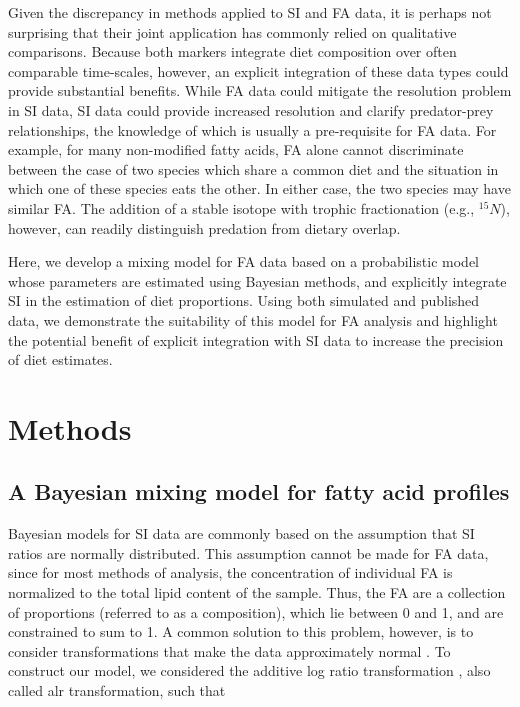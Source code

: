 \documentclass{article}%
\begin{document}
\begin{spacing}{1.9}
\begin{flushleft}
Given the discrepancy in methods applied to SI and FA data, it is
perhaps not surprising that their joint application has commonly
relied on qualitative comparisons. Because both markers integrate diet
composition over often comparable time-scales, however, an explicit
integration of these data types could provide substantial
benefits. While FA data could mitigate the resolution problem in SI
data, SI data could provide increased resolution and clarify
predator-prey relationships, the knowledge of which is usually a
pre-requisite for FA data. For example, for many non-modified fatty
acids, FA alone cannot discriminate between the case of two species
which share a common diet and the situation in which one of these
species eats the other.  In either case, the two species may have
similar FA. The addition of a stable isotope with trophic
fractionation (e.g., $^{15}N$), however, can readily distinguish predation
from dietary overlap.

Here, we develop a mixing model for FA data based on a probabilistic
model whose parameters are estimated using Bayesian methods, and
explicitly integrate SI in the estimation of diet proportions. Using both simulated and
published data, we demonstrate the suitability of this model for FA analysis and
highlight the potential benefit of explicit integration with SI data
to increase the precision of diet estimates.
 
\section{Methods}
\subsection{A Bayesian mixing model for fatty acid profiles}

Bayesian models for SI data are commonly based on the assumption that
SI ratios are normally distributed. This assumption cannot be made for
FA data, since for most methods of analysis, the concentration of
individual FA is normalized to the total lipid content of the
sample. Thus, the FA are a collection of proportions (referred to as
a composition), which lie between 0 and 1, and are constrained to sum
to 1. A common solution to this problem, however, is to consider
transformations that make the data approximately normal
\citep{budge_studying_2006}. To construct our model, we considered the
additive log ratio transformation \citep{aitchison_convex_1999},
also called alr transformation, such that


\end{flushleft}
\end{spacing}
\end{document}
